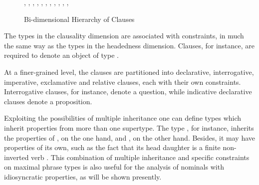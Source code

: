 \documentclass[output=paper]{langsci/langscibook}
\begin{document}
\begin{figure}
\footnotesize
\begin{center}
\tree
    {,
      {, 
        {,
          {}, 
          {}}, 
        {}}, 
      {,
        {,
          {, 
            {}},
          {}}, 
        {}}} 
\caption{Bi-dimensional Hierarchy of Clauses \label{bidim}}  
\normalsize
\end{center}
\end{figure}

The types in the {\sc clausality} dimension are associated with constraints,
in much the same way as the types in the {\sc headedness} dimension.  
Clauses, for instance, are required to denote an object of type  
\citep[41]{GS00}.

\begin{exe}
\ex 
\begin{avm} 
\end{avm}
\end{exe}

\noindent
At a finer-grained level, the clauses are partitioned into 
declarative, interrogative, imperative, exclamative and relative
clauses, each with their own constraints. 
Interrogative clauses, for instance, denote a question, 
while indicative declarative clauses denote a proposition.

Exploiting the possibilities of multiple inheritance one can 
define types which inherit properties from more than one supertype. 
The type , for instance, inherits 
the properties of , on the one hand, and 
, on the other hand. Besides, it may 
have properties of its own, such as the fact that its head daughter 
is a finite non-inverted verb \citep[43]{GS00}. 
This combination of multiple inheritance and specific   
constraints on maximal phrase types is also useful for the analysis of 
nominals with idiosyncratic properties, as will be shown presently. 
\end{document}
